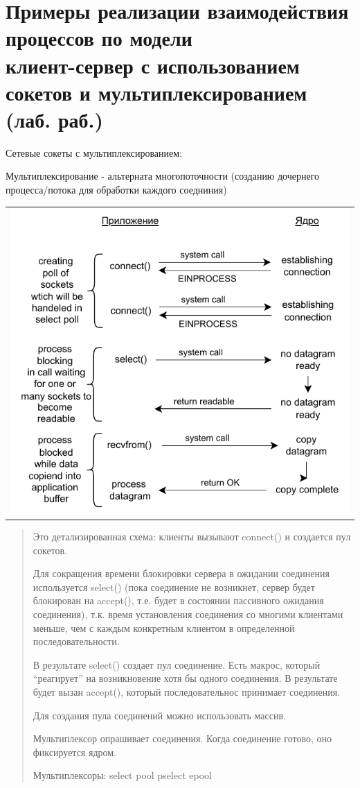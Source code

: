 \section{Примеры реализации взаимодействия процессов по модели \\ клиент-сервер с использованием сокетов и мультиплексированием (лаб. раб.)}

Сетевые сокеты с мультиплексированием:

Мультиплексирование - альтерната многопоточности (созданию дочернего процесса/потока для обработки каждого соедниния)

\begin{table}[H]
  \centering
  \begin{tabular}{p{1\linewidth}}
    \centering
    \includegraphics[width=0.8\linewidth]{./images/5.pdf}
  \end{tabular}
\end{table}

\begin{quote}
Это детализированная схема: клиенты вызывают connect() и создается пул сокетов.

Для сокращения времени блокировки сервера в ожидании соединения используется select() (пока соединение не возникнет, сервер будет блокирован на accept(), т.е. будет в состоянии пассивного ожидания соединения), т.к. время установления соединения со многими клиентами меньше, чем с каждым конкретным клиентом в определенной последовательности.

В результате select() создает пул соединение. Есть макрос, который “реагирует” на возникновение хотя бы одного соединения. В результате будет вызан accept(), который последовательнос принимает соединения.

Для создания пула соединений можно использовать массив.

Мультиплексор опрашивает соединения. Когда соединение готово, оно фиксируется ядром.

Мультиплексоры: 
select    pool
pselect   epool
\end{quote}

